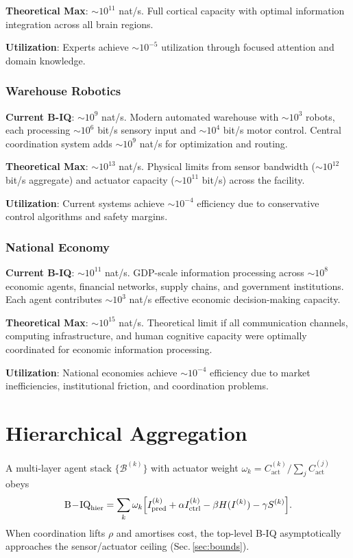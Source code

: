 \documentclass[10pt,conference]{IEEEtran}
\begin{document}
\textbf{Theoretical Max}: $\sim 10^{11}$ nat/s. Full cortical capacity with optimal information integration across all brain regions.

\textbf{Utilization}: Experts achieve $\sim 10^{-5}$ utilization through focused attention and domain knowledge.

\subsubsection{Warehouse Robotics}
\textbf{Current B-IQ}: $\sim 10^9$ nat/s. Modern automated warehouse with $\sim 10^3$ robots, each processing $\sim 10^6$ bit/s sensory input and $\sim 10^4$ bit/s motor control. Central coordination system adds $\sim 10^9$ nat/s for optimization and routing.

\textbf{Theoretical Max}: $\sim 10^{13}$ nat/s. Physical limits from sensor bandwidth ($\sim 10^{12}$ bit/s aggregate) and actuator capacity ($\sim 10^{11}$ bit/s) across the facility.

\textbf{Utilization}: Current systems achieve $\sim 10^{-4}$ efficiency due to conservative control algorithms and safety margins.

\subsubsection{National Economy}
\textbf{Current B-IQ}: $\sim 10^{11}$ nat/s. GDP-scale information processing across $\sim 10^8$ economic agents, financial networks, supply chains, and government institutions. Each agent contributes $\sim 10^3$ nat/s effective economic decision-making capacity.

\textbf{Theoretical Max}: $\sim 10^{15}$ nat/s. Theoretical limit if all communication channels, computing infrastructure, and human cognitive capacity were optimally coordinated for economic information processing.

\textbf{Utilization}: National economies achieve $\sim 10^{-4}$ efficiency due to market inefficiencies, institutional friction, and coordination problems.

\section{Hierarchical Aggregation}
A multi-layer agent stack \(\{\mathcal B^{(k)}\}\) with actuator weight
\(\omega_k=C_{\mathrm{act}}^{(k)}/\sum_j C_{\mathrm{act}}^{(j)}\) obeys
\begin{equation}
\mathrm{B\!-\!IQ}_{\text{hier}}
=\sum_k\omega_k\Bigl[I_{\mathrm{pred}}^{(k)}
+\alpha I_{\mathrm{ctrl}}^{(k)}
-\beta H(I^{(k)})
-\gamma S^{(k)}\Bigr].
\end{equation}
When coordination lifts \(\rho\) and amortises cost, the top-level B-IQ asymptotically approaches the sensor/actuator ceiling (Sec.\,\ref{sec:bounds}).
\end{document}
